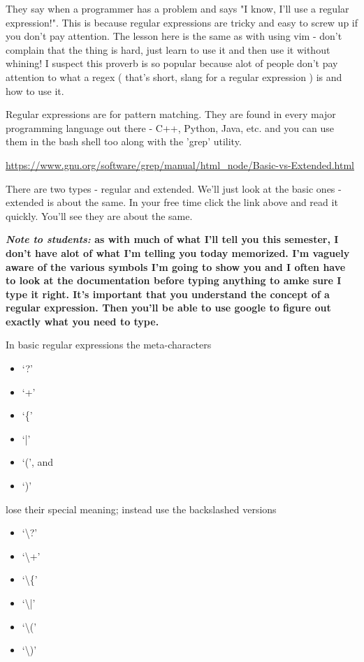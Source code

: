 \documentclass[10pt]{article}
\begin{document}
They say when a programmer has a problem and says "I know, I'll use a regular expression!". This is because regular expressions are tricky and easy to screw up if you don't pay attention. The lesson here is the same as with using vim - don't complain that the thing is hard, just learn to use it and then use it without whining! I suspect this proverb is so popular because alot of people don't pay attention to what a regex ( that's short, slang for a regular expression ) is and how to use it. 

Regular expressions are for pattern matching. They are found in every major programming language out there - C++, Python, Java, etc. and you can use them in the bash shell too along with the 'grep' utility.

\url{https://www.gnu.org/software/grep/manual/html_node/Basic-vs-Extended.html}

There are two types - regular and extended. We'll just look at the basic ones - extended is about the same. In your free time click the link above and read it quickly. You'll see they are about the same.

{\Large\textbf{\textit{Note to students:} as with much of what I'll tell you this
semester, I don't have alot of what I'm telling you today memorized. I'm vaguely
aware of the various symbols I'm going to show you and I often have to look at
the documentation before typing anything to amke sure I type it right. It's
important that you understand the concept of a regular expression. Then you'll
be able to use google to figure out exactly what you need to type.}}

In basic regular expressions the meta-characters
\begin{itemize}
\item `?'
\item `+'
\item `\{'
\item `|'
\item `(', and
\item `)'
\end{itemize}

 lose their special meaning; instead use the backslashed versions

\begin{itemize}
\item `\textbackslash?'
\item `\textbackslash+'
\item `\textbackslash\{'
\item `\textbackslash|'
\item `\textbackslash('
\item `\textbackslash)'
\end{itemize}
\end{document}

